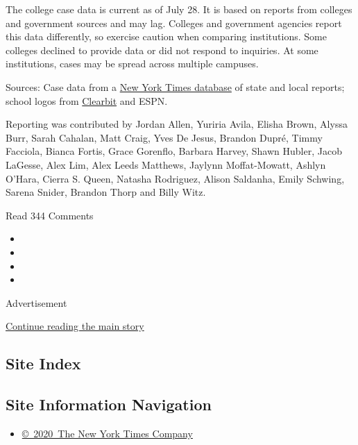 The college case data is current as of July 28. It is based on reports
from colleges and government sources and may lag. Colleges and
government agencies report this data differently, so exercise caution
when comparing institutions. Some colleges declined to provide data or
did not respond to inquiries. At some institutions, cases may be spread
across multiple campuses.

Sources: Case data from a
\href{https://www.nytimes.com/interactive/2020/us/coronavirus-us-cases.html}{New
York Times database} of state and local reports; school logos from
\href{https://clearbit.com}{Clearbit} and ESPN.

Reporting was contributed by Jordan Allen, Yuriria Avila, Elisha Brown,
Alyssa Burr, Sarah Cahalan, Matt Craig, Yves De Jesus, Brandon Dupré,
Timmy Facciola, Bianca Fortis, Grace Gorenflo, Barbara Harvey, Shawn
Hubler, Jacob LaGesse, Alex Lim, Alex Leeds Matthews, Jaylynn
Moffat-Mowatt, Ashlyn O'Hara, Cierra S. Queen, Natasha Rodriguez, Alison
Saldanha, Emily Schwing, Sarena Snider, Brandon Thorp and Billy Witz.

Read 344 Comments

\begin{itemize}
\item
\item
\item
\item
\end{itemize}

Advertisement

\protect\hyperlink{after-bottom}{Continue reading the main story}

\hypertarget{site-index}{%
\subsection{Site Index}\label{site-index}}

\hypertarget{site-information-navigation}{%
\subsection{Site Information
Navigation}\label{site-information-navigation}}

\begin{itemize}
\tightlist
\item
  \href{https://help.nytimes.com/hc/en-us/articles/115014792127-Copyright-notice}{©~2020~The
  New York Times Company}
\end{itemize}

